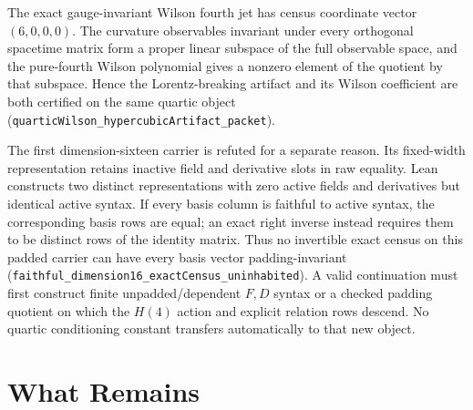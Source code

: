 \documentclass[11pt]{article}
\newcommand{\lean}[1]{\texttt{#1}}
\begin{document}
The exact gauge-invariant Wilson fourth jet has census coordinate vector
\((6,0,0,0)\).  The curvature observables invariant under every orthogonal
spacetime matrix form a proper linear subspace of the full observable space,
and the pure-fourth Wilson polynomial gives a nonzero element of the quotient
by that subspace.  Hence the Lorentz-breaking artifact and its Wilson coefficient are
both certified on the same quartic object
(\lean{quarticWilson\_hypercubicArtifact\_packet}).

The first dimension-sixteen carrier is refuted for a separate reason.  Its
fixed-width representation retains inactive field and derivative slots in raw
equality.  Lean constructs two distinct representations with zero active
fields and derivatives but identical active syntax.  If every basis column is
faithful to active syntax, the corresponding basis rows are equal; an exact
right inverse instead requires them to be distinct rows of the identity
matrix.  Thus no invertible exact census on this padded carrier can have every
basis vector padding-invariant
(\lean{faithful\_dimension16\_exactCensus\_uninhabited}).  A valid continuation
must first construct finite unpadded/dependent \(F,D\) syntax or a checked
padding quotient on which the \(H(4)\) action and explicit relation rows
descend.  No quartic conditioning constant transfers automatically to that
new object.

\section{What Remains}
\end{document}
